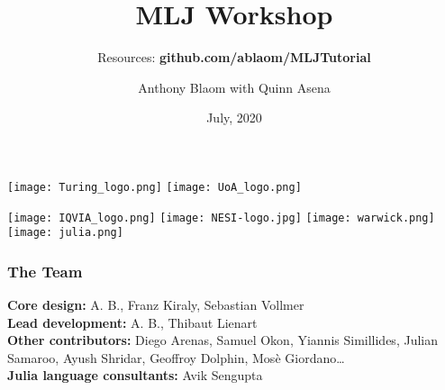 \documentclass[t]{beamer}
\title{\color{Maroon} MLJ Workshop}
\subtitle{{\small Resources: \bfseries{github.com/ablaom/MLJTutorial}}}
\date{July, 2020}
\author{Anthony Blaom with Quinn Asena}
\newcommand\df{\bf\color{Maroon}}
\newcommand\dff{\bf\color{dkgreen}}
\begin{document}



\begin{frame}
	\titlepage
\end{frame}

\begin{frame}
  \vspace{0\baselineskip}
  \begin{center}
    \texttt{[image: Turing\_logo.png]}
    \texttt{[image: UoA\_logo.png]}
    
    \texttt{[image: IQVIA\_logo.png]}
    \texttt{[image: NESI-logo.jpg]}
    \texttt{[image: warwick.png]}
    \texttt{[image: julia.png]}    
  \end{center}
\end{frame}

\begin{frame}
  \frametitle{The Team}

  {\small
    {\dff Core design:} A. B., Franz Kiraly, Sebastian Vollmer\\[1\baselineskip]

    {\dff Lead development:} A. B., Thibaut Lienart \\[1\baselineskip]

    {\dff Other contributors:} Diego Arenas, Samuel Okon, Yiannis Simillides, Julian Samaroo, Ayush Shridar, Geoffroy Dolphin, Mosè Giordano\ldots \\[1\baselineskip]
    
    {\dff Julia language consultants:} Avik Sengupta\\[1\baselineskip]}
  
\end{frame}

\end{document}
